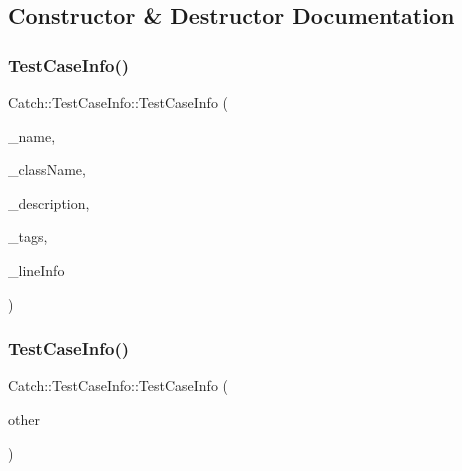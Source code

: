 \subsection{Constructor \& Destructor Documentation}
\hypertarget{struct_catch_1_1_test_case_info_a35ec65315e0d1f178491b5a59f3f3123}{}\label{struct_catch_1_1_test_case_info_a35ec65315e0d1f178491b5a59f3f3123} 
\subsubsection{\texorpdfstring{Test\+Case\+Info()}{TestCaseInfo()}\hspace{0.1cm}{\footnotesize\ttfamily [1/2]}}
{\footnotesize\ttfamily Catch\+::\+Test\+Case\+Info\+::\+Test\+Case\+Info (\begin{DoxyParamCaption}\item[{std\+::string const \&}]{\+\_\+name,  }\item[{std\+::string const \&}]{\+\_\+class\+Name,  }\item[{std\+::string const \&}]{\+\_\+description,  }\item[{std\+::set$<$ std\+::string $>$ const \&}]{\+\_\+tags,  }\item[{\hyperlink{struct_catch_1_1_source_line_info}{Source\+Line\+Info} const \&}]{\+\_\+line\+Info }\end{DoxyParamCaption})}

\hypertarget{struct_catch_1_1_test_case_info_ac338adb4e38f4bf3977fb45b2b1fe447}{}\label{struct_catch_1_1_test_case_info_ac338adb4e38f4bf3977fb45b2b1fe447} 
\subsubsection{\texorpdfstring{Test\+Case\+Info()}{TestCaseInfo()}\hspace{0.1cm}{\footnotesize\ttfamily [2/2]}}
{\footnotesize\ttfamily Catch\+::\+Test\+Case\+Info\+::\+Test\+Case\+Info (\begin{DoxyParamCaption}\item[{\hyperlink{struct_catch_1_1_test_case_info}{Test\+Case\+Info} const \&}]{other }\end{DoxyParamCaption})}



